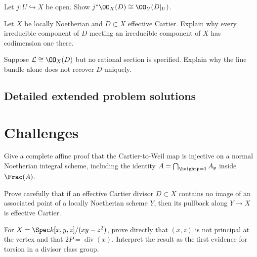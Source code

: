 \begin{problem}\label{prob:vi40-10}
Let \(j:U\hookrightarrow X\) be open.  Show \(j^*\OO_X(D)\cong\OO_U(D|_U)\).
\end{problem}
\begin{problem}\label{prob:vi40-11}
Let \(X\) be locally Noetherian and \(D\subset X\) effective Cartier.  Explain why every irreducible component of \(D\) meeting an irreducible component of \(X\) has codimension one there.
\end{problem}
\begin{problem}\label{prob:vi40-12}
Suppose \(\mathcal L\cong\OO_X(D)\) but no rational section is specified.  Explain why the line bundle alone does not recover \(D\) uniquely.
\end{problem}
\ifdefined\FullProblemDossiers
\subsection*{Detailed extended problem solutions}

\fi
\section{Challenges}
\begin{problem}\label{chal:vi40-01}
Give a complete affine proof that the Cartier-to-Weil map is injective on a normal Noetherian integral scheme, including the identity \(A=\bigcap_{\height\mathfrak p=1}A_{\mathfrak p}\) inside \(\Frac(A)\).
\end{problem}

\begin{problem}\label{chal:vi40-02}
Prove carefully that if an effective Cartier divisor \(D\subset X\) contains no image of an associated point of a locally Noetherian scheme \(Y\), then its pullback along \(Y\to X\) is effective Cartier.
\end{problem}

\begin{problem}\label{chal:vi40-03}
For \(X=\Spec k[x,y,z]/(xy-z^2)\), prove directly that \((x,z)\) is not principal at the vertex and that \(2P=\operatorname{div}(x)\).  Interpret the result as the first evidence for torsion in a divisor class group.
\end{problem}

